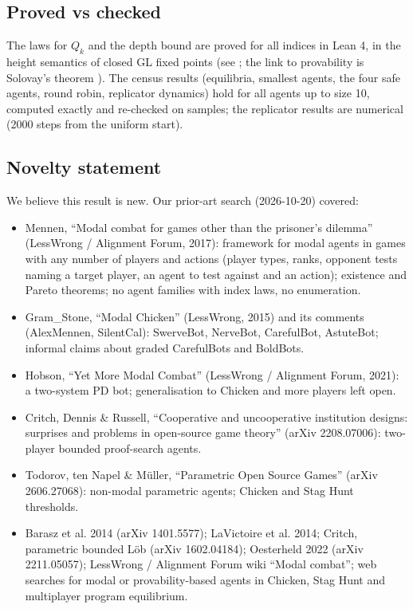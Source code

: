 \documentclass{article}
\begin{document}
\subsection*{Proved vs checked}

The laws for $Q_k$ and the depth bound are proved for all indices in Lean 4, in the height
semantics of closed GL fixed points (see \cite{boolos1993logic}; the link to provability is Solovay's
theorem \cite{solovay1976provability}). The census results (equilibria, smallest agents, the four safe
agents, round robin, replicator dynamics) hold for all agents up to size 10, computed exactly and
re-checked on samples; the replicator results are numerical (2000 steps from the uniform start).

\subsection*{Novelty statement}

We believe this result is new. Our prior-art search (2026-10-20) covered:

\begin{itemize}
\item Mennen, ``Modal combat for games other than the prisoner's dilemma'' (LessWrong / Alignment Forum, 2017): framework for modal agents in games with any number of players and actions (player types, ranks, opponent tests naming a target player, an agent to test against and an action); existence and Pareto theorems; no agent families with index laws, no enumeration.
\item Gram\_Stone, ``Modal Chicken'' (LessWrong, 2015) and its comments (AlexMennen, SilentCal): SwerveBot, NerveBot, CarefulBot, AstuteBot; informal claims about graded CarefulBots and BoldBots.
\item Hobson, ``Yet More Modal Combat'' (LessWrong / Alignment Forum, 2021): a two-system PD bot; generalisation to Chicken and more players left open.
\item Critch, Dennis \& Russell, ``Cooperative and uncooperative institution designs: surprises and problems in open-source game theory'' (arXiv 2208.07006): two-player bounded proof-search agents.
\item Todorov, ten Napel \& Müller, ``Parametric Open Source Games'' (arXiv 2606.27068): non-modal parametric agents; Chicken and Stag Hunt thresholds.
\item Barasz et al. 2014 (arXiv 1401.5577); LaVictoire et al. 2014; Critch, parametric bounded Löb (arXiv 1602.04184); Oesterheld 2022 (arXiv 2211.05057); LessWrong / Alignment Forum wiki ``Modal combat''; web searches for modal or provability-based agents in Chicken, Stag Hunt and multiplayer program equilibrium.
\end{itemize}
\end{document}
